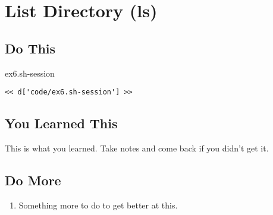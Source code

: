 \chapter{List Directory (ls)}

\section{Do This}

\begin{code}{ex6.sh-session}
\begin{Verbatim}
<< d['code/ex6.sh-session'] >>
\end{Verbatim}
\end{code}


\section{You Learned This}

This is what you learned.  Take notes and come back if you didn't get it.

\section{Do More}

\begin{enumerate}
\item Something more to do to get better at this.
\end{enumerate}

